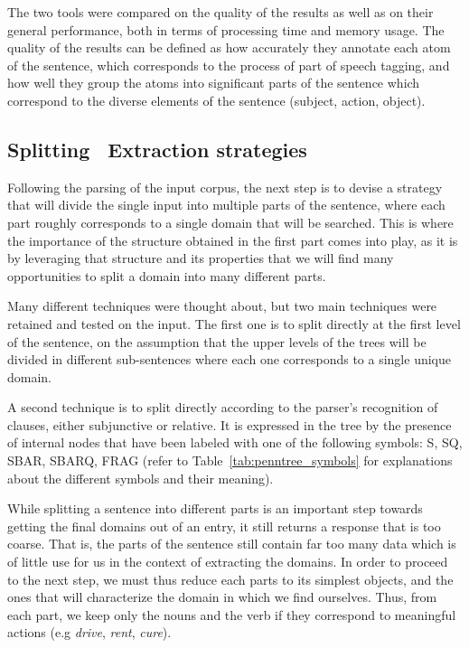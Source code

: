 The two tools were compared on the quality of the results as well as on their general performance, both in terms of processing time and memory usage. The quality of the results can be defined as how accurately they annotate each atom of the sentence, which corresponds to the process of part of speech tagging, and how well they group the atoms into significant parts of the sentence which correspond to the diverse elements of the sentence (subject, action, object).


\subsection{Splitting \amper\ Extraction strategies} %
\label{sub:extraction_strategies}

Following the parsing of the input corpus, the next step is to devise a strategy that will divide the single input into multiple parts of the sentence, where each part roughly corresponds to a single domain that will be searched. This is where the importance of the structure obtained in the first part comes into play, as it is by leveraging that structure and its properties that we will find many opportunities to split a domain into many different parts.

Many different techniques were thought about, but two main techniques were retained and tested on the input. The first one is to split directly at the first level of the sentence, on the assumption that the upper levels of the trees will be divided in different sub-sentences where each one corresponds to a single unique domain.

A second technique is to split directly according to the parser's recognition of clauses, either subjunctive or relative. It is expressed in the tree by the presence of internal nodes that have been labeled with one of the following symbols: S, SQ, SBAR, SBARQ, FRAG (refer to Table~\ref{tab:penntree_symbols} for explanations about the different symbols and their meaning).

While splitting a sentence into different parts is an important step towards getting the final domains out of an entry, it still returns a response that is too coarse. That is, the parts of the sentence still contain far too many data which is of little use for us in the context of extracting the domains. In order to proceed to the next step, we must thus reduce each parts to its simplest objects, and the ones that will characterize the domain in which we find ourselves. Thus, from each part, we keep only the nouns and the verb if they correspond to meaningful actions (e.g \emph{drive}, \emph{rent}, \emph{cure}).

